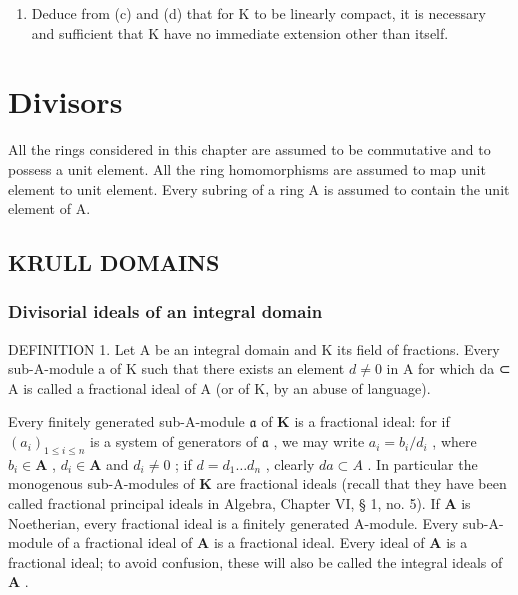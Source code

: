 \begin{enumerate}
\def\labelenumi{(\alph{enumi})}
\setcounter{enumi}{4}
\tightlist
\item
  Deduce from (c) and (d) that for K to be linearly compact, it is necessary and sufficient that K have no immediate extension other than itself.
\end{enumerate}

\chapter{Divisors}

All the rings considered in this chapter are assumed to be commutative and to possess a unit element. All the ring homomorphisms are assumed to map unit element to unit element. Every subring of a ring A is assumed to contain the unit element of A.

\section{KRULL DOMAINS}

\subsection{Divisorial ideals of an integral domain}

DEFINITION 1. Let A be an integral domain and K its field of fractions. Every sub-A-module a of K such that there exists an element \(d \neq 0\) in A for which da ⊂ A is called a fractional ideal of A (or of K, by an abuse of language).

Every finitely generated sub-A-module \(\mathfrak{a}\) of \(\mathbf{K}\) is a fractional ideal: for if \((a_{i})_{1\leqslant i\leqslant n}\) is a system of generators of \(\mathfrak{a}\) , we may write \(a_{i} = b_{i} / d_{i}\) , where \(b_{i}\in \mathbf{A}\) , \(d_{i}\in \mathbf{A}\) and \(d_{i}\neq 0\) ; if \(d = d_{1}\ldots d_{n}\) , clearly \(da\subset A\) . In particular the monogenous sub-A-modules of \(\mathbf{K}\) are fractional ideals (recall that they have been called fractional principal ideals in Algebra, Chapter VI, § 1, no. 5). If \(\mathbf{A}\) is Noetherian, every fractional ideal is a finitely generated A-module. Every sub-A-module of a fractional ideal of \(\mathbf{A}\) is a fractional ideal. Every ideal of \(\mathbf{A}\) is a fractional ideal; to avoid confusion, these will also be called the integral ideals of \(\mathbf{A}\) .

